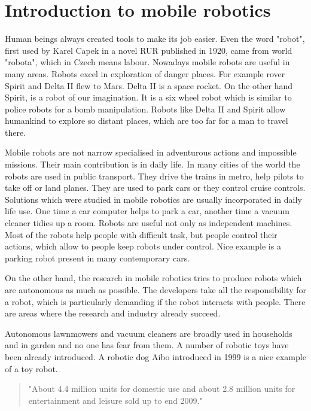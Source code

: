 \documentclass[12pt,notitlepage]{report}
\begin{document}
\chapter{Introduction to mobile robotics}
\label{chap:robotics}
	Human beings always created tools to make its job easier. 
	Even the word "robot", first used by Karel Capek in a novel RUR published in 1920, came from world "robota", 
	which in Czech means labour.
	Nowadays mobile robots are useful in many areas. Robots excel in exploration of danger places. 
	For example rover Spirit and Delta II flew to Mars.
	Delta II is a space rocket. On the other hand Spirit, is a robot of our imagination. It is a six wheel robot
	which is similar to police robots for a bomb manipulation.
	Robots like Delta II and Spirit allow humankind to explore so distant places, which are too far for a man to travel there.
	
	Mobile robots are not narrow specialised in adventurous actions and impossible missions. 
	Their main contribution is in daily life.
	In many cities of the world the robots are used in public transport. They drive the trains in metro,
	help pilots to take off or land planes. They are used to park cars or they control cruise controls.
	Solutions which were studied in mobile robotics are usually incorporated in daily life use. 
	One time a car computer helps to park a car,
	another time a vacuum cleaner tidies up a room.
	Robots are useful not only as independent machines. Most of the robots help people with difficult task, 
	but people control their actions, which allow to people keep robots under control.
	Nice example is a parking robot present in many contemporary cars.
	
	
	On the other hand, the research in mobile robotics tries to produce robots which are autonomous as much as possible.
	The developers take all the responsibility for a robot, which is particularly demanding if the robot interacts with people. 
	There are areas where the research and industry already succeed.
	
	Autonomous lawnmowers and vacuum cleaners are broadly used in households and in garden and no one has fear from them.
	A number of robotic toys have been already introduced.
	A robotic dog Aibo introduced in 1999 is a nice example of a toy robot.
	
	\begin{quote}
	"About 4.4 million units for domestic use and about 2.8 million units for entertainment and leisure sold up to end 2009."
	\cite{worldrob}
	\end{quote}
	
\end{document}
